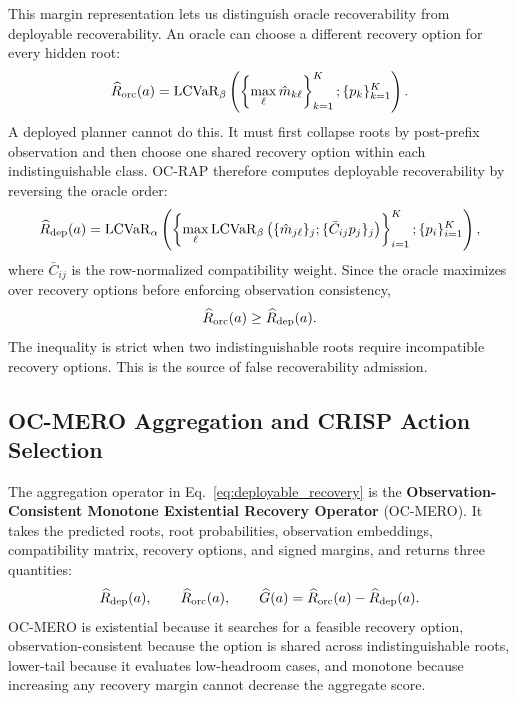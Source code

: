 \documentclass[conference]{IEEEtran}
\begin{document}
This margin representation lets us distinguish oracle recoverability from deployable recoverability.  An oracle can choose a different recovery option for every hidden root:
\begin{equation}
    \widehat R_{\rm orc}(a)
    =
    \operatorname{LCVaR}_{\beta}
    \left(
        \left\{
        \max_{\ell} \hat m_{k\ell}
        \right\}_{k=1}^{K};
        \{p_k\}_{k=1}^{K}
    \right).
    \label{eq:oracle_recovery}
\end{equation}
A deployed planner cannot do this.  It must first collapse roots by post-prefix observation and then choose one shared recovery option within each indistinguishable class.  OC-RAP therefore computes deployable recoverability by reversing the oracle order:
\begin{equation}
    \widehat R_{\rm dep}(a)
    =
    \operatorname{LCVaR}_{\alpha}
    \left(
        \left\{
        \max_{\ell}
        \operatorname{LCVaR}_{\beta}
        \big(
            \{\hat m_{j\ell}\}_{j};
            \{\bar C_{ij}p_j\}_{j}
        \big)
        \right\}_{i=1}^{K};
        \{p_i\}_{i=1}^{K}
    \right),
    \label{eq:deployable_recovery}
\end{equation}
where $\bar C_{ij}$ is the row-normalized compatibility weight.  Since the oracle maximizes over recovery options before enforcing observation consistency,
\begin{equation}
    \widehat R_{\rm orc}(a)
    \geq
    \widehat R_{\rm dep}(a).
    \label{eq:oracle_gap}
\end{equation}
The inequality is strict when two indistinguishable roots require incompatible recovery options.  This is the source of false recoverability admission.

\subsection{OC-MERO Aggregation and CRISP Action Selection}
\label{subsec:ocmero_crisp}

The aggregation operator in Eq.~\eqref{eq:deployable_recovery} is the \textbf{Observation-Consistent Monotone Existential Recovery Operator} (OC-MERO).  It takes the predicted roots, root probabilities, observation embeddings, compatibility matrix, recovery options, and signed margins, and returns three quantities:
\begin{equation}
    \widehat R_{\rm dep}(a), \qquad
    \widehat R_{\rm orc}(a), \qquad
    \widehat G(a)=\widehat R_{\rm orc}(a)-\widehat R_{\rm dep}(a).
\end{equation}
OC-MERO is existential because it searches for a feasible recovery option, observation-consistent because the option is shared across indistinguishable roots, lower-tail because it evaluates low-headroom cases, and monotone because increasing any recovery margin cannot decrease the aggregate score.
\end{document}
